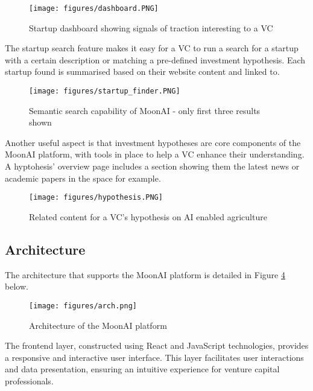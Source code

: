 \documentclass[a4paper, oneside]{discothesis}
\begin{document}
\begin{figure}[h]
    \centering
    \texttt{[image: figures/dashboard.PNG]}
    \caption{Startup dashboard showing signals of traction interesting to a VC}
    \label{fig:dashboard}
\end{figure}

The startup search feature makes it easy for a VC to run a search for a startup with a certain description or matching a pre-defined investment hypothesis. Each startup found is summarised based on their website content and linked to. 

\begin{figure}[h]
    \centering
    \texttt{[image: figures/startup\_finder.PNG]}
    \caption{Semantic search capability of MoonAI - only first three results shown}
    \label{fig:startup_finder}
\end{figure}

Another useful aspect is that investment hypotheses are core components of the MoonAI platform, with tools in place to help a VC enhance their understanding. A hyptohesis' overview page includes a section showing them the latest news or academic papers in the space for example. 

\begin{figure}[h]
    \centering
    \texttt{[image: figures/hypothesis.PNG]}
    \caption{Related content for a VC's hypothesis on AI enabled agriculture }
    \label{fig:hypothesis}
\end{figure}

\pagebreak

\subsection{Architecture}

\noindent The architecture that supports the MoonAI platform is detailed in Figure \ref{fig:architecture} below.

\begin{figure}[h]
    \centering
    \texttt{[image: figures/arch.png]}
    \caption{Architecture of the MoonAI platform}
    \label{fig:architecture}
\end{figure}

The frontend layer, constructed using React and JavaScript technologies, provides a responsive and interactive user interface. This layer facilitates user interactions and data presentation, ensuring an intuitive experience for venture capital professionals.
\end{document}
